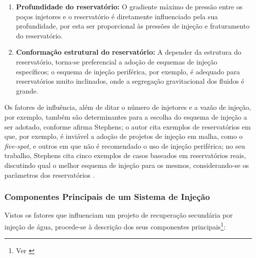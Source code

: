 \begin{enumerate}
\item \textbf{Profundidade do reservat\'{o}rio:} O gradiente m\'{a}ximo de press\~{a}o entre os po\c{c}os injetores e o reservat\'{o}rio \'{e} diretamente influenciado pela sua profundidade, por esta ser proporcional \`{a}s press\~{o}es de inje\c{c}\~{a}o e fraturamento do reservat\'{o}rio.

\item \textbf{Conforma\c{c}\~{a}o estrutural do reservat\'{o}rio:} A depender da estrutura do reservat\'{o}rio, torna-se preferencial a ado\c{c}\~{a}o de esquemas de inje\c{c}\~{a}o espec\'{i}ficos; o esquema de inje\c{c}\~{a}o perif\'{e}rica, por exemplo, \'{e} adequado para reservat\'{o}rios muito inclinados, onde a segrega\c{c}\~{a}o gravitacional dos fluidos \'{e} grande.
\end{enumerate}

Os fatores de influ\^{e}ncia, al\'{e}m de ditar o n\'{u}mero de injetores e a vaz\~{a}o de inje\c{c}\~{a}o, por exemplo, tamb\'{e}m s\~{a}o determinantes para a escolha do esquema de inje\c{c}\~{a}o a ser adotado, conforme afirma Stephens; o autor cita exemplos de reservat\'{o}rios em que, por exemplo, \'{e} invi\'{a}vel a ado\c{c}\~{a}o de projetos de inje\c{c}\~{a}o em malha, como o \textit{five-spot}, e outros em que n\~{a}o \'{e} recomendado o uso de inje\c{c}\~{a}o perif\'{e}rica; no seu trabalho, Stephens cita cinco exemplos de casos baseados em reservat\'{o}rios reais, discutindo qual o melhor esquema de inje\c{c}\~{a}o para os mesmos, considerando-se os par\^{a}metros dos reservat\'{o}rios \cite{stephens1960}.

\subsubsection{Componentes Principais de um Sistema de Inje\c{c}\~{a}o}

Vistos os fatores que influenciam um projeto de recupera\c{c}\~{a}o secund\'{a}ria por inje\c{c}\~{a}o de \'{a}gua, procede-se \`{a} descri\c{c}\~{a}o dos seus componentes principais\footnote{Ver \cite[pp. 653-659]{engres}}:

